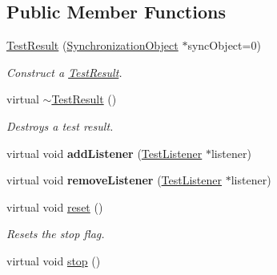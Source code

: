 \subsection*{Public Member Functions}
\begin{DoxyCompactItemize}
\item 
\hyperlink{class_test_result_a51781d20e0edeceae06589f1d9c90b48}{Test\+Result} (\hyperlink{class_synchronized_object_1_1_synchronization_object}{Synchronization\+Object} $\ast$sync\+Object=0)\hypertarget{class_test_result_a51781d20e0edeceae06589f1d9c90b48}{}\label{class_test_result_a51781d20e0edeceae06589f1d9c90b48}

\begin{DoxyCompactList}\small\item\em Construct a \hyperlink{class_test_result}{Test\+Result}. \end{DoxyCompactList}\item 
virtual \hyperlink{class_test_result_a318d2696f70564678f866bad6d5510b6}{$\sim$\+Test\+Result} ()\hypertarget{class_test_result_a318d2696f70564678f866bad6d5510b6}{}\label{class_test_result_a318d2696f70564678f866bad6d5510b6}

\begin{DoxyCompactList}\small\item\em Destroys a test result. \end{DoxyCompactList}\item 
virtual void {\bfseries add\+Listener} (\hyperlink{class_test_listener}{Test\+Listener} $\ast$listener)\hypertarget{class_test_result_aaa44db4de1b095eff670e433f12d51de}{}\label{class_test_result_aaa44db4de1b095eff670e433f12d51de}

\item 
virtual void {\bfseries remove\+Listener} (\hyperlink{class_test_listener}{Test\+Listener} $\ast$listener)\hypertarget{class_test_result_a695fb70894352cead51d0db8ec59b3e8}{}\label{class_test_result_a695fb70894352cead51d0db8ec59b3e8}

\item 
virtual void \hyperlink{class_test_result_a5122b5d4edddb4b2d4ea9c214eed8c3f}{reset} ()\hypertarget{class_test_result_a5122b5d4edddb4b2d4ea9c214eed8c3f}{}\label{class_test_result_a5122b5d4edddb4b2d4ea9c214eed8c3f}

\begin{DoxyCompactList}\small\item\em Resets the stop flag. \end{DoxyCompactList}\item 
virtual void \hyperlink{class_test_result_ada481ef1a01dfa7737a1bf019f352855}{stop} ()\hypertarget{class_test_result_ada481ef1a01dfa7737a1bf019f352855}{}\label{class_test_result_ada481ef1a01dfa7737a1bf019f352855}


\end{DoxyCompactItemize}
